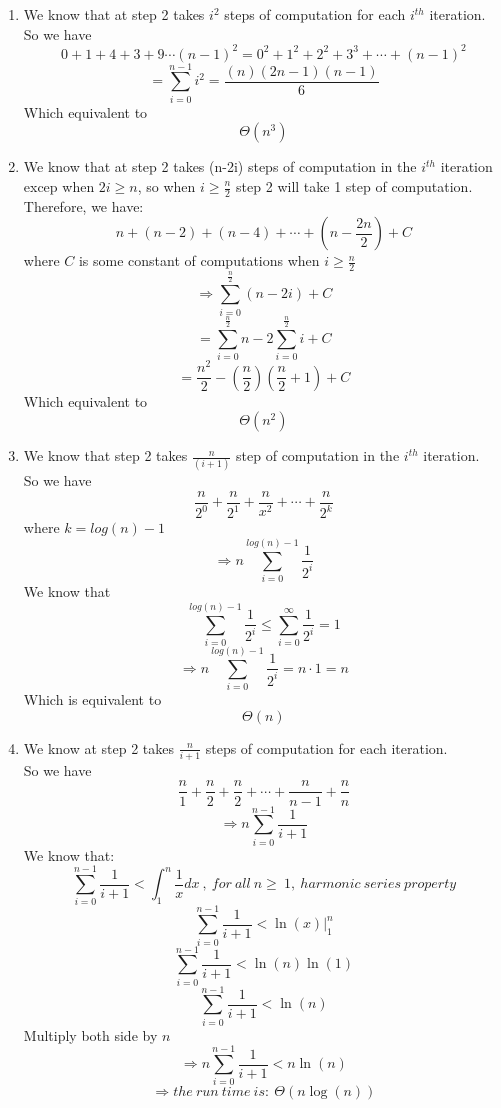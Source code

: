 \documentclass[11pt]{article}
\newenvironment{qparts}{\begin{enumerate}[{(}a{)}]}{\end{enumerate}}
\begin{document}
\begin{qparts}
\Large{}
\item %
We know that at step 2 takes $i^2$ steps of computation for each $i^{th}$ iteration.\\
So we have $$0 + 1 + 4 + 3 + 9 \cdots (n-1)^2 = 0^2 + 1^2 + 2^2 + 3^3 + \cdots + (n-1)^2$$
$$=\sum\limits_{i=0}^{n-1} i^2 = \frac{(n)(2n - 1)(n - 1)}{6}$$
Which equivalent to $$\boxed{\Theta(n^3)}$$
 
\item %
We know that at step 2 takes (n-2i) steps of computation in the $i^{th}$ iteration excep when $2i\geqslant n$, so when $i \geqslant \frac{n}{2}$ step 2 will take 1 step of computation.\\
Therefore, we have: 
$$n +  (n-2) + (n-4) + \cdots + (n- \frac{2n}{2}) + C$$ where $C$ is some constant of computations when $i \geqslant \frac{n}{2}$
$$\Longrightarrow  \sum\limits_{i = 0}^{\frac{n}{2}} (n - 2i) + C$$
$$= \sum\limits_{i = 0}^{\frac{n}{2}} n - 2\sum\limits_{i = 0}^{\frac{n}{2}} i + C$$
$$= \frac{n^2}{2} - (\frac{n}{2})(\frac{n}{2} + 1) + C$$
Which equivalent to $$\boxed{\Theta{(n^2)}}$$

\item %
We know that step 2 takes $\frac{n}{(i + 1)}$ step of computation in the $i^{th}$ iteration.\\
So we have
$$\frac{n}{2^0} + \frac{n}{2^1} + \frac{n}{x^2} + \cdots + \frac{n}{2^k}$$
where $k = log(n) - 1$
$$\Longrightarrow n\sum\limits_{i=0}^{log(n)-1} \frac{1}{2^i}$$
We know that $$\sum\limits_{i=0}^{log(n)-1} \frac{1}{2^i} \leqslant \sum\limits_{i=0}^\infty \frac{1}{2^i} = 1$$
$$\Longrightarrow n\sum\limits_{i=0}^{log(n)-1} \frac{1}{2^i} = n \cdot 1 = n$$
Which is equivalent to $$\boxed{\Theta{(n)}}$$
\item %
We know at step 2 takes $\frac{n}{i+1}$ steps of computation for each iteration.\\
So we have
$$\frac{n}{1} + \frac{n}{2} + \frac{n}{2} + \cdots + \frac{n}{n-1} + \frac{n}{n}$$
$$\Longrightarrow n\sum\limits_{i=0}^{n-1} \frac{1}{i+1} $$
We know that:
$$\sum\limits_{i=0}^{n-1} \frac{1}{i+1} < \int_1^n \frac{1}{x} dx\ ,\ for\ all\ n \geqslant\ 1,\ harmonic\ series\ property$$
$$\sum\limits_{i=0}^{n-1} \frac{1}{i+1} < \ln(x) \Big|_1^n$$
$$\sum\limits_{i=0}^{n-1} \frac{1}{i+1} < \ln(n) \ln(1)$$
$$\sum\limits_{i=0}^{n-1} \frac{1}{i+1} < \ln(n) $$
Multiply both side by $n$
$$\Longrightarrow n\sum\limits_{i=0}^{n-1} \frac{1}{i+1} < n\ln(n)$$
$$\Longrightarrow the\ run\ time\ is:\ \Theta(n\log(n))$$
\end{qparts}
\end{document}
